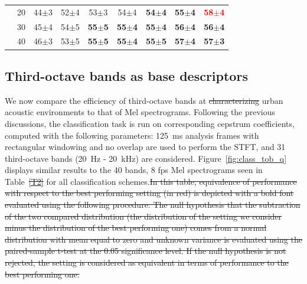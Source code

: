 \documentclass[sensors,article,submit,moreauthors,pdftex,10pt,a4paper]{mdpi}
\providecommand{\DIFaddtex}[1]{{\protect\color{blue}\uwave{#1}}} %
\providecommand{\DIFdeltex}[1]{{\protect\color{red}\sout{#1}}}                      %
\providecommand{\DIFaddbegin}{} %
\providecommand{\DIFaddend}{} %
\providecommand{\DIFdelbegin}{} %
\providecommand{\DIFdelend}{} %
\providecommand{\DIFadd}[1]{\texorpdfstring{\DIFaddtex{#1}}{#1}} %
\providecommand{\DIFdel}[1]{\texorpdfstring{\DIFdeltex{#1}}{}} %
\begin{document}
\begin{table}[h]
\begin{tabular}{ll|c|c|c|c|c|c|c|}
\multicolumn{1}{|c}{}
 & \multicolumn{1}{|c|}{20} & 44$\pm$3 & 52$\pm$4 & 53$\pm$3 & 54$\pm$4 & \textbf{54$\pm$4} & \textbf{55$\pm$4} & \textbf{\textcolor{red}{58$\pm$4}} \\ \cline{2-9}
\multicolumn{1}{|c}{}
 & \multicolumn{1}{|c|}{30} & 45$\pm$4 & 54$\pm$5 & \textbf{55$\pm$5} & \textbf{55$\pm$4} & \textbf{55$\pm$4} & \textbf{56$\pm$4} & \textbf{56$\pm$4} \\ \cline{2-9}
\multicolumn{1}{|c}{}
 & \multicolumn{1}{|c|}{40} & 46$\pm$3 & 53$\pm$5 & \textbf{55$\pm$5} & \textbf{55$\pm$4} & \textbf{55$\pm$5} & \textbf{57$\pm$4} & \textbf{57$\pm$3} \\ \cline{1-9}
\end{tabular}

\end{table}



\subsection{Third-octave bands as base descriptors} \DIFaddbegin \label{sec:tob_r}
\DIFaddend 

We now compare the efficiency of third-octave bands at \DIFdelbegin \DIFdel{characterizing }\DIFdelend \DIFaddbegin \DIFadd{differenciating sound sources in }\DIFaddend urban acoustic environments to that of Mel spectrograms. Following the previous discussions, the classification task is run on corresponding cepstrum coefficients, computed with the following parameters: 125~ms analysis frames with rectangular windowing and no overlap are used to perform the STFT, and 31 third-octave bands (20~Hz - 20~kHz) are considered. Figure~\ref{fig:class_tob_q} displays similar results to the 40 bands, 8 fps Mel spectrograms seen in Table~\DIFdelbegin \DIFdel{\ref{T2} }\DIFdelend \DIFaddbegin \DIFadd{\ref{T1} }\DIFaddend for all classification schemes.\DIFdelbegin \DIFdel{In this table, equivalence of performance with respect to the best performing setting (in red) is depicted with a bold font evaluated using the following procedure. The null hypothesis that the subtraction of the two compared distribution (the distribution of the setting we consider minus the distribution of the best performing one) comes from a normal distribution with mean equal to zero and unknown variance is evaluated using the paired-sample t-test at the 0.05 significance level. If the null hypothesis is not rejected, the setting is considered as equivalent in terms of performance to the best performing one. }\DIFdelend \\
\end{document}

